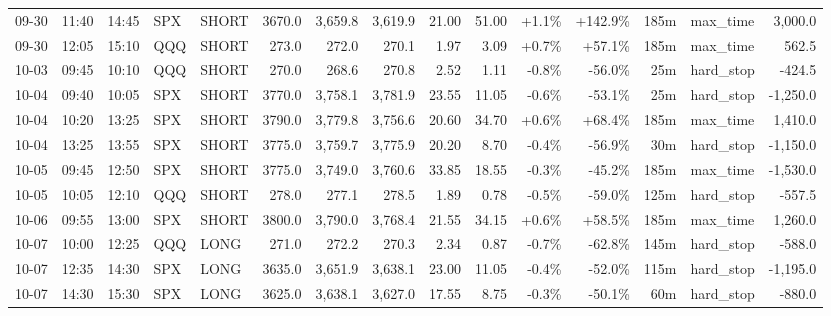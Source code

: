 \documentclass[11pt,a4paper,twoside]{article}
\begin{document}
\begin{landscape}
\begin{center}
\begin{longtable}{>{\color{txtmain}}l l l l l r r r r r r r r >{\color{txtmain}}l r}
09-30 & 11:40 & 14:45 & SPX & SHORT & 3670.0 & 3,659.8 & 3,619.9 & 21.00 & 51.00 & \textcolor{wingreen}{+1.1\%} & \textcolor{wingreen}{+142.9\%} & 185m & max\_time & \textcolor{wingreen}{3,000.0} \\
09-30 & 12:05 & 15:10 & QQQ & SHORT & 273.0 & 272.0 & 270.1 & 1.97 & 3.09 & \textcolor{wingreen}{+0.7\%} & \textcolor{wingreen}{+57.1\%} & 185m & max\_time & \textcolor{wingreen}{562.5} \\
10-03 & 09:45 & 10:10 & QQQ & SHORT & 270.0 & 268.6 & 270.8 & 2.52 & 1.11 & \textcolor{lossred}{-0.8\%} & \textcolor{lossred}{-56.0\%} & 25m & hard\_stop & \textcolor{lossred}{-424.5} \\
10-04 & 09:40 & 10:05 & SPX & SHORT & 3770.0 & 3,758.1 & 3,781.9 & 23.55 & 11.05 & \textcolor{lossred}{-0.6\%} & \textcolor{lossred}{-53.1\%} & 25m & hard\_stop & \textcolor{lossred}{-1,250.0} \\
10-04 & 10:20 & 13:25 & SPX & SHORT & 3790.0 & 3,779.8 & 3,756.6 & 20.60 & 34.70 & \textcolor{wingreen}{+0.6\%} & \textcolor{wingreen}{+68.4\%} & 185m & max\_time & \textcolor{wingreen}{1,410.0} \\
10-04 & 13:25 & 13:55 & SPX & SHORT & 3775.0 & 3,759.7 & 3,775.9 & 20.20 & 8.70 & \textcolor{lossred}{-0.4\%} & \textcolor{lossred}{-56.9\%} & 30m & hard\_stop & \textcolor{lossred}{-1,150.0} \\
10-05 & 09:45 & 12:50 & SPX & SHORT & 3775.0 & 3,749.0 & 3,760.6 & 33.85 & 18.55 & \textcolor{lossred}{-0.3\%} & \textcolor{lossred}{-45.2\%} & 185m & max\_time & \textcolor{lossred}{-1,530.0} \\
10-05 & 10:05 & 12:10 & QQQ & SHORT & 278.0 & 277.1 & 278.5 & 1.89 & 0.78 & \textcolor{lossred}{-0.5\%} & \textcolor{lossred}{-59.0\%} & 125m & hard\_stop & \textcolor{lossred}{-557.5} \\
10-06 & 09:55 & 13:00 & SPX & SHORT & 3800.0 & 3,790.0 & 3,768.4 & 21.55 & 34.15 & \textcolor{wingreen}{+0.6\%} & \textcolor{wingreen}{+58.5\%} & 185m & max\_time & \textcolor{wingreen}{1,260.0} \\
10-07 & 10:00 & 12:25 & QQQ & LONG & 271.0 & 272.2 & 270.3 & 2.34 & 0.87 & \textcolor{lossred}{-0.7\%} & \textcolor{lossred}{-62.8\%} & 145m & hard\_stop & \textcolor{lossred}{-588.0} \\
10-07 & 12:35 & 14:30 & SPX & LONG & 3635.0 & 3,651.9 & 3,638.1 & 23.00 & 11.05 & \textcolor{lossred}{-0.4\%} & \textcolor{lossred}{-52.0\%} & 115m & hard\_stop & \textcolor{lossred}{-1,195.0} \\
10-07 & 14:30 & 15:30 & SPX & LONG & 3625.0 & 3,638.1 & 3,627.0 & 17.55 & 8.75 & \textcolor{lossred}{-0.3\%} & \textcolor{lossred}{-50.1\%} & 60m & hard\_stop & \textcolor{lossred}{-880.0} \\

\end{longtable}
\end{center}
\end{landscape}
\end{document}
